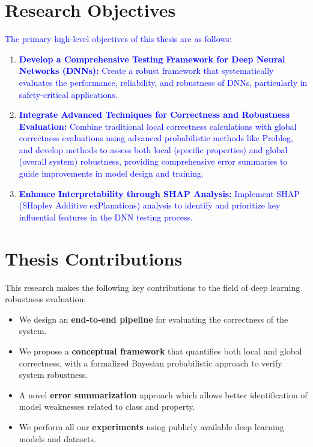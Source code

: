   \section{Research Objectives}
  
  \textcolor{blue}{The primary high-level objectives of this thesis are as follows:}
  
  \begin{enumerate}
    \item \textcolor{blue}{\textbf{Develop a Comprehensive Testing Framework for Deep Neural Networks (DNNs):}
    Create a robust framework that systematically evaluates the performance, reliability, and robustness of DNNs, particularly in safety-critical applications.}
    
    \item \textcolor{blue}{\textbf{Integrate Advanced Techniques for Correctness and Robustness Evaluation:}
    Combine traditional local correctness calculations with global correctness evaluations using advanced probabilistic methods like Problog, and develop methods to assess both local (specific properties) and global (overall system) robustness, providing comprehensive error summaries to guide improvements in model design and training.}
    
    \item \textcolor{blue}{\textbf{Enhance Interpretability through SHAP Analysis:}
    Implement SHAP (SHapley Additive exPlanations) analysis to identify and prioritize key influential features in the DNN testing process.}
    
\end{enumerate}


\section{Thesis Contributions}\hypertarget{contributions}{}

This research makes the following key contributions to the field of deep learning robustness evaluation:
\begin{itemize}
    \item We design an \textbf{end-to-end pipeline} for evaluating the correctness of the system.
    \item We propose a \textbf{conceptual framework} that quantifies both local and global correctness, with a formalized Bayesian probabilistic approach to verify system robustness.
    \item A novel \textbf{error summarization} approach which allows better identification of model weaknesses related to class and property.
    \item We perform all our \textbf{experiments} using publicly available deep learning models and datasets.
\end{itemize}

